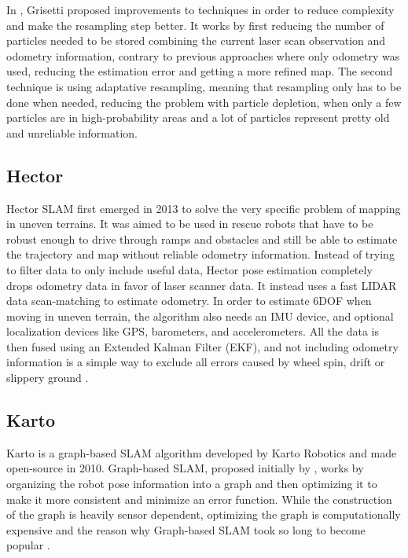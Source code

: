 In \cite{grisetti2007improved}, Grisetti proposed improvements to \citeauthor{doucet2000rao} techniques in order to reduce complexity and make the resampling step better. It works by first reducing the number of particles needed to be stored combining the current laser scan observation and odometry information, contrary to previous approaches where only odometry was used, reducing the estimation error and getting a more refined map. The second technique is using adaptative resampling, meaning that resampling only has to be done when needed, reducing the problem with particle depletion, when only a few particles are in high-probability areas and a lot of particles represent pretty old and unreliable information.

\subsection{Hector}

Hector SLAM first emerged in 2013 to solve the very specific problem of mapping in uneven terrains. It was aimed to be used in rescue robots that have to be robust enough to drive through ramps and obstacles and still be able to estimate the trajectory and map without reliable odometry information. Instead of trying to filter data to only include useful data, Hector pose estimation completely drops odometry data in favor of laser scanner data. It instead uses a fast LIDAR data scan-matching to estimate odometry. In order to estimate 6DOF when moving in uneven terrain, the algorithm also needs an IMU device, and optional localization devices like GPS, barometers, and accelerometers. All the data is then fused using an Extended Kalman Filter (EKF), and not including odometry information is a simple way to exclude all errors caused by wheel spin, drift or slippery ground \cite{kohlbrecher2011flexible}.

\subsection{Karto}

Karto is a graph-based SLAM algorithm developed by Karto Robotics and made open-source in 2010. Graph-based SLAM, proposed initially by \citeauthor{lu1997globally}, works by organizing the robot pose information into a graph and then optimizing it to make it more consistent and minimize an error function. While the construction of the graph is heavily sensor dependent, optimizing the graph is computationally expensive and the reason why Graph-based SLAM took so long to become popular \cite{grisetti2010tutorial}.

